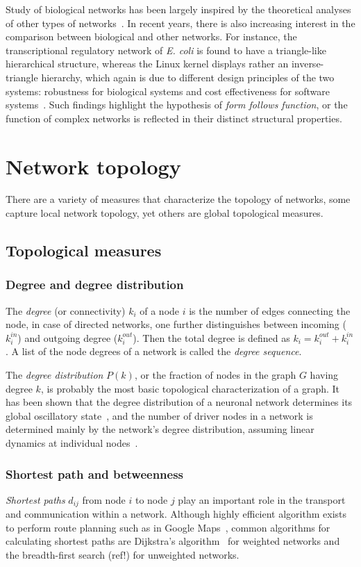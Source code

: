 Study of biological networks has been largely inspired by the theoretical 
analyses of other types of networks~\citep{Barabasi2004}. In recent years, 
there is also increasing interest in the comparison between biological and
other networks. For instance, the transcriptional regulatory network of 
\emph{E. coli} is found to have a triangle-like hierarchical 
structure, whereas the Linux kernel displays rather an inverse-triangle
hierarchy, which again is due to different design principles of the two 
systems: robustness for biological systems and cost effectiveness for 
software systems~\citep{Yan2010}.
Such findings highlight the hypothesis of \emph{form follows function}, or 
the function of complex networks is reflected in their distinct structural 
properties.

\section{Network topology}
There are a variety of measures that characterize the topology of networks,
some capture local network topology, yet others are global topological measures.

\subsection{Topological measures}

\subsubsection{Degree and degree distribution}
The \emph{degree} (or connectivity) $k_i$ of a node $i$ is the number of edges 
connecting the node, in case of directed networks, one further distinguishes
between incoming ($k_i^{in}$) and outgoing degree ($k_i^{out}$). Then the total 
degree is defined as $k_i = k_i^{out} + k_i^{in}$. A list of the node degrees 
of a network is called the \emph{degree sequence}.

The \emph{degree distribution} $P(k)$, or the fraction of nodes in the graph 
$G$ having degree $k$, is probably the most basic topological 
characterization of a graph. It has been shown that the degree distribution of
a neuronal network determines its global oscillatory state~\citep{Roxin2011}, 
and the number of driver nodes in a network is determined mainly by the 
network's degree distribution, assuming linear dynamics at
individual nodes~\citep{Liu2011}.

\subsubsection{Shortest path and betweenness}
\label{sec:shortest_path}
\emph{Shortest paths} $d_{ij}$ from node $i$ to node $j$ play an important 
role in the transport and communication 
within a network. Although highly efficient algorithm exists to perform
route planning such as in Google Maps~\citep{Sanders2005}, common algorithms
for calculating shortest paths are Dijkstra's algorithm~\citep{Dijkstra1959} for weighted networks
and the breadth-first search (ref!) for unweighted networks.

